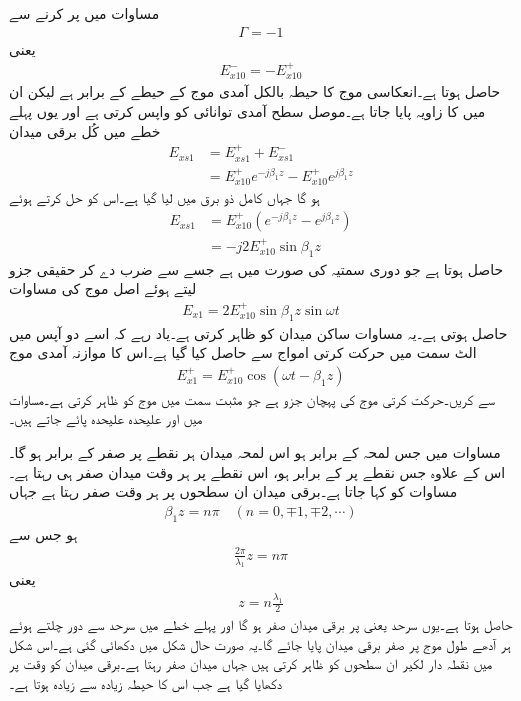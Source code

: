 مساوات  میں  پر کرنے سے
\begin{align*}
\Gamma=-1
\end{align*}
یعنی
\begin{align*}
E_{x10}^-=-E_{x10}^+
\end{align*}
حاصل ہوتا ہے۔انعکاسی موج کا حیطہ بالکل آمدی موج کے حیطے کے برابر ہے لیکن ان میں  کا زاویہ پایا جاتا ہے۔موصل سطح آمدی توانائی کو واپس کرتی ہے اور یوں پہلے خطے میں کُل برقی میدان
\begin{align*}
E_{xs1}&=E_{xs1}^+ +E_{xs1}^-\\
&=E_{x10}^+ e^{-j \beta_1 z}-E_{x10}^+ e^{j \beta_1 z}
\end{align*}
ہو گا جہاں کامل ذو برق میں  لیا گیا ہے۔اس کو حل کرتے ہوئے
\begin{align*}
E_{xs1}&=E_{x10}^+ \left(e^{-j \beta_1 z}-e^{j\beta_1 z} \right)\\
&=-j 2 E_{x10}^+ \sin \beta_1 z
\end{align*}
حاصل ہوتا ہے جو دوری سمتیہ کی صورت میں ہے جسے  سے ضرب دے کر حقیقی جزو لیتے ہوئے اصل موج کی مساوات
\begin{align}\label{مساوات_موج_دو_امواج_برابر_ساکن_موج}
E_{x1}=2 E_{x10}^+ \sin \beta_1 z \sin \omega t
\end{align}
حاصل ہوتی ہے۔یہ مساوات ساکن میدان کو ظاہر کرتی ہے۔یاد رہے کہ اسے دو آپس میں الٹ سمت میں حرکت کرتی امواج سے حاصل کیا گیا ہے۔اس کا موازنہ آمدی موج
\begin{align*}
E_{x1}^+=E_{x10}^+ \cos (\omega t - \beta_1 z)
\end{align*}
سے کریں۔حرکت کرتی موج کی پہچان جزو  ہے جو مثبت سمت میں موج کو ظاہر کرتی ہے۔مساوات  میں  اور  علیحدہ علیحدہ پائے جاتے ہیں۔

مساوات  میں جس لمحہ  کے برابر ہو اس لمحہ میدان ہر نقطے پر صفر کے برابر ہو گا۔اس کے علاوہ جس نقطے پر   کے برابر ہو، اس نقطے پر ہر وقت میدان صفر ہی رہتا ہے۔مساوات  کو  کہا جاتا ہے۔برقی میدان ان سطحوں پر ہر وقت صفر رہتا ہے جہاں
\begin{align*}
\beta_1 z = n\pi \quad (n=0,\mp 1, \mp 2, \cdots)
\end{align*}
ہو جس سے
\begin{align*}
\frac{2\pi}{\lambda_1} z =n \pi
\end{align*}
یعنی
\begin{align*}
z=n\frac{\lambda_1}{2}
\end{align*}
حاصل ہوتا ہے۔یوں سرحد یعنی  پر برقی میدان صفر ہو گا اور پہلے خطے میں سرحد سے دور چلتے ہوئے ہر آدھے  طول موج پر صفر برقی میدان پایا جائے گا۔یہ صورت حال شکل  میں دکھائی گئی ہے۔اس شکل میں نقطہ دار لکیر ان سطحوں کو ظاہر کرتی ہیں جہاں میدان صفر رہتا ہے۔برقی میدان کو وقت  پر دکھایا گیا ہے جب اس کا حیطہ زیادہ سے زیادہ ہوتا ہے۔ 

